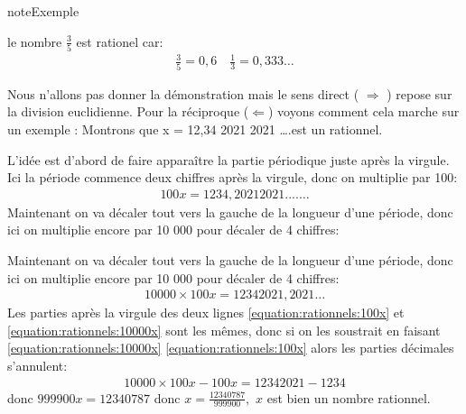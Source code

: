 \documentclass[letterpaper,10pt,french]{jupyterBook}
\begin{document}
\begin{sphinxadmonition}{note}{Exemple}

\sphinxAtStartPar
le nombre \(\frac{3}{5}\) est rationel car:
\begin{equation*}
\begin{split}
\frac{3}{5}=0,6\quad \frac{1}{3}=0,333\ldots
\end{split}
\end{equation*}\end{sphinxadmonition}

\sphinxAtStartPar
Nous n’allons pas donner la démonstration mais le sens direct ( \(\Rightarrow\) ) repose sur la division euclidienne. Pour la
réciproque (\(\Leftarrow\)) voyons comment cela marche sur un exemple : Montrons que x = 12,34 2021 2021 ….est un rationnel.

\sphinxAtStartPar
L’idée est d’abord de faire apparaître la partie périodique juste après la virgule. Ici la période commence deux chiffres
après la virgule, donc on multiplie par 100:
\begin{equation}\label{equation:rationnels:100x}
\begin{split}
100x=1234,2021 2021 ....\ldots
\end{split}
\end{equation}
\sphinxAtStartPar
Maintenant on va décaler tout vers la gauche de la longueur d’une période, donc ici on multiplie encore par 10 000
pour décaler de 4 chiffres:

\sphinxAtStartPar
Maintenant on va décaler tout vers la gauche de la longueur d’une période, donc ici on multiplie encore par 10 000
pour décaler de 4 chiffres:
\begin{equation}\label{equation:rationnels:10000x}
\begin{split}
10 000\times 100x= 1234 2021, 2021 \ldots
\end{split}
\end{equation}
\sphinxAtStartPar
Les parties après la virgule des deux lignes \eqref{equation:rationnels:100x} et \eqref{equation:rationnels:10000x} sont les mêmes, donc si on les soustrait en faisant \eqref{equation:rationnels:10000x} \sphinxhyphen{} \eqref{equation:rationnels:100x} alors les parties décimales s’annulent:
\begin{equation*}
\begin{split}
10 000 \times 100x-100x = 12 342 021-1234
\end{split}
\end{equation*}
\sphinxAtStartPar
donc \(999 900x = 12 340 787\) donc \(x=\frac{12 340 787}{999 900},\) \(x\) est bien un nombre rationnel.
\end{document}
